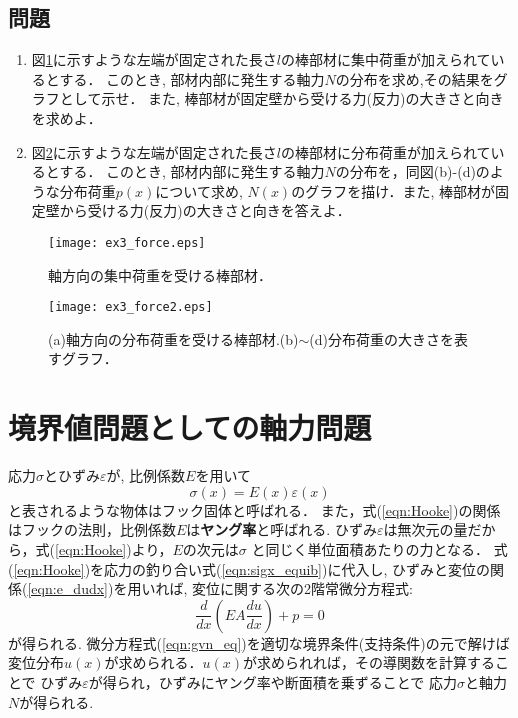 \documentclass[10pt,a4j]{jbook}
\begin{document}
\subsection{問題}\label{prb_equiv}
\begin{enumerate}
\item
図\ref{fig:fig3}に示すような左端が固定された長さ$l$の棒部材に集中荷重が加えられているとする．
このとき, 部材内部に発生する軸力$N$の分布を求め,その結果をグラフとして示せ．
また, 棒部材が固定壁から受ける力(反力)の大きさと向きを求めよ．
\item
図\ref{fig:fig3_2}に示すような左端が固定された長さ$l$の棒部材に分布荷重が加えられているとする．
このとき, 部材内部に発生する軸力$N$の分布を，同図(b)-(d)のような分布荷重$p(x)$について求め,
$N(x)$のグラフを描け．また, 棒部材が固定壁から受ける力(反力)の大きさと向きを答えよ．
\end{enumerate}
\begin{figure}[h]
	\begin{center}
	\texttt{[image: ex3\_force.eps]} 
	\end{center}
	\caption{軸方向の集中荷重を受ける棒部材．} 
	\label{fig:fig3}
\end{figure}
\begin{figure}[h]
	\begin{center}
	\texttt{[image: ex3\_force2.eps]} 
	\end{center}
	\caption{(a)軸方向の分布荷重を受ける棒部材.(b)$\sim$(d)分布荷重の大きさを表すグラフ．} 
	\label{fig:fig3_2}
\end{figure}
\section{境界値問題としての軸力問題}\label{BVP}
応力$\sigma$とひずみ$\varepsilon$が, 比例係数$E$を用いて
\begin{equation}
	\sigma(x) =E(x) \varepsilon (x)
	\label{eqn:Hooke}
\end{equation}
と表されるような物体はフック固体と呼ばれる．
また，式(\ref{eqn:Hooke})の関係はフックの法則，比例係数$E$は{\bf ヤング率}と呼ばれる. 
ひずみ$\varepsilon$は無次元の量だから，式(\ref{eqn:Hooke})より，$E$の次元は$\sigma$
と同じく単位面積あたりの力となる．
式(\ref{eqn:Hooke})を応力の釣り合い式(\ref{eqn:sigx_equib})に代入し, 
ひずみと変位の関係(\ref{eqn:e_dudx})を用いれば, 
変位に関する次の2階常微分方程式:
\begin{equation}
	\frac{d}{dx}\left( EA \frac{du}{dx} \right)+p=0
	\label{eqn:gvn_eq}
\end{equation}
が得られる. 微分方程式(\ref{eqn:gvn_eq})を適切な境界条件(支持条件)の元で解けば
変位分布$u(x)$が求められる．$u(x)$が求められれば，その導関数を計算することで
ひずみ$\varepsilon$が得られ，ひずみにヤング率や断面積を乗ずることで
応力$\sigma$と軸力$N$が得られる.
\end{document}
